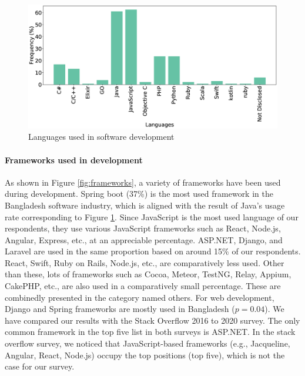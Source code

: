 \begin{figure}[h]
\centering
  \includegraphics[scale=0.18]{Figures/Respondents_languages}
  \caption{Languages used in software development}
  \label{fig:languages}
\end{figure}

\paragraph{Frameworks used in development}
As shown in Figure \ref{fig:frameworks}, a variety of frameworks have been used during development. Spring boot (37\%) is the most used framework in the Bangladesh software industry, which is aligned with the result of Java's usage rate corresponding to Figure \ref{fig:languages}. Since JavaScript is the most used language of our respondents, they use various JavaScript frameworks such as React, Node.js, Angular, Express, etc., at an appreciable percentage. ASP.NET, Django, and Laravel are used in the same proportion based on around 15\% of our respondents. React, Swift, Ruby on Rails, Node.js, etc., are comparatively less used. Other than these, lots of frameworks such as Cocoa, Meteor, TestNG, Relay, Appium, CakePHP, etc., are also used in a comparatively small percentage. These are combinedly presented in the category named others. For web development, Django and Spring frameworks are mostly used in Bangladesh ($p=0.04$). We have compared our results with the Stack Overflow 2016 to 2020 survey\cite{StackoverflowSurvey2017, StackoverflowSurvey2018, StackoverflowSurvey2019, StackoverflowSurvey2020}. The only common framework in the top five list in both surveys is ASP.NET. In the stack overflow survey, we noticed that JavaScript-based frameworks (e.g., Jacqueline, Angular, React, Node.js) occupy the top positions (top five), which is not the case for our survey.

